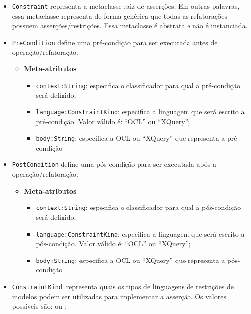 \begin{itemize}
    
    \item \texttt{Constraint} representa a metaclasse raiz de asserções. Em outras palavras, essa metaclasse representa de forma genérica que todas as refatorações possuem asserções/restrições. Essa metaclasse é abstrata e não é instanciada.
    
    \item \texttt{PreCondition} define uma pré-condição para ser executada antes de operação/refatoração.

\begin{itemize}
	\item \textbf{Meta-atributos}
		\begin{itemize}
			\item \texttt{context:String}: especifica o classificador para qual a pré-condição será definido;
			\item \texttt{language:ConstraintKind}: especifica a linguagem que será escrito a pré-condição. Valor válido é: ``OCL'' ou ``XQuery'';
			\item \texttt{body:String}: especifica a OCL ou ``XQuery'' que representa a pré-condição.
		\end{itemize}	
\end{itemize} 

\item \texttt{PostCondition} define uma pós-condição para ser executada após a operação/refatoração.

\begin{itemize}
	\item \textbf{Meta-atributos}
		\begin{itemize}
			\item \texttt{context:String}: especifica o classificador para qual a pós-condição será definido;
			\item \texttt{language:ConstraintKind}: especifica a linguagem que será escrito a pós-condição. Valor válido é: ``OCL'' ou ``XQuery'';
			\item \texttt{body:String}: especifica a OCL ou ``XQuery'' que representa a pós-condição.
		\end{itemize}	
\end{itemize}

\item \texttt{ConstraintKind}: representa quais os tipos de linguagens de restrições de modelos podem ser utilizadas para implementar a asserção. Os valores possíveis são:  ou ;
    
\end{itemize}

